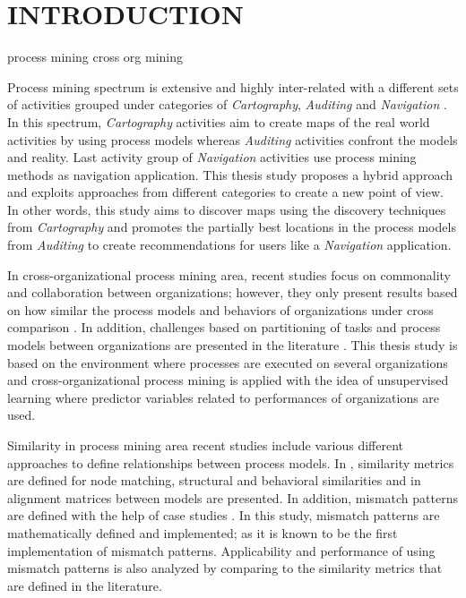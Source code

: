 \chapter{INTRODUCTION}
\label{chp:introduction}


process mining  
cross org mining 


Process mining spectrum is extensive and highly inter-related with a different sets of activities grouped under categories of \textit{Cartography}, \textit{Auditing} and \textit{Navigation} \cite{van2011process}. In this spectrum, \textit{Cartography} activities aim to create maps of the real world activities by using process models whereas \textit{Auditing} activities confront the models and reality. Last activity group of \textit{Navigation} activities use process mining methods as navigation application. This thesis study proposes a hybrid approach and exploits approaches from different categories to create a new point of view. In other words, this study aims to discover maps using the discovery techniques from \textit{Cartography} and promotes the partially best locations in the process models from \textit{Auditing} to create recommendations for users like a \textit{Navigation} application. 

In cross-organizational process mining area, recent studies focus on commonality and collaboration between organizations; however, they only present results based on how similar the process models and behaviors of organizations under cross comparison \cite{buijs2012towards}. In addition, challenges based on partitioning of tasks and process models between organizations are presented in the literature \cite{van2011intra}. This thesis study is based on the environment where processes are executed on several organizations and cross-organizational process mining is applied with the idea of unsupervised learning where predictor variables related to performances of organizations are used.

Similarity in process mining area recent studies include various different approaches to define relationships between process models. In \cite{dijkman2011similarity}, similarity metrics are defined for node matching, structural and behavioral similarities and in \cite{buijs2014comparing} alignment matrices between models are presented. In addition, mismatch patterns are defined with the help of case studies \cite{dijkman2007mismatch}. In this study, mismatch patterns are mathematically defined and implemented; as it is known to be the first implementation of mismatch patterns. Applicability and performance of using mismatch patterns is also analyzed by comparing to the similarity metrics that are defined in the literature. 

